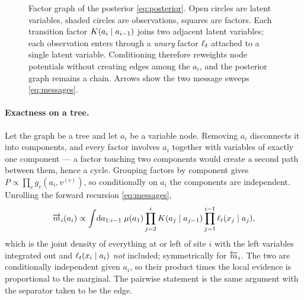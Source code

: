 \begin{figure}[!htbp]
\centering
{}
\caption{Factor graph of the posterior \eqref{eq:posterior}. Open circles are latent variables,
shaded circles are observations, squares are factors. Each transition factor
$K(a_i\mid a_{i-1})$ joins two adjacent latent variables; each observation enters through a
\emph{unary} factor $\ell_t$ attached to a single latent variable. Conditioning therefore reweights
node potentials without creating edges among the $a_i$, and the posterior graph remains a chain.
Arrows show the two message sweeps \eqref{eq:messages}.}
\label{fig:factorgraph}
\end{figure}

\paragraph{Exactness on a tree.} Let the graph be a tree and let $a_i$ be a variable node.
Removing $a_i$ disconnects it into components, and every factor involves $a_i$ together with
variables of exactly one component --- a factor touching two components would create a second
path between them, hence a cycle. Grouping factors by component gives
$P \propto \prod_c g_c(a_i, v^{(c)})$, so conditionally on $a_i$ the components are independent.
Unrolling the forward recursion \eqref{eq:messages},
\[
\overrightarrow{m}_i(a_i) \propto \int\!\mathrm{d}a_{1:i-1}\;
\mu(a_1)\prod_{j=2}^{i}K(a_j\mid a_{j-1})\prod_{j=1}^{i-1}\ell_t(x_j\mid a_j),
\]
which is the joint density of everything at or left of site $i$ with the left variables
integrated out and $\ell_t(x_i\mid a_i)$ \emph{not} included; symmetrically for $\overleftarrow{m}_i$. The two
are conditionally independent given $a_i$, so their product times the local evidence is
proportional to the marginal. The pairwise statement is the same argument with the separator
taken to be the edge.

